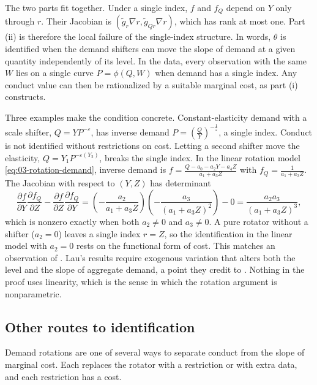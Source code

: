 The two parts fit together. Under a single index, $f$ and $f_Q$ depend on $Y$ only through $r$. Their Jacobian is
$\left(\tilde g_r \nabla r, \tilde g_{Qr}\nabla r\right)$, which has rank at most one. Part (ii) is therefore the local
failure of the single-index structure. In words, $\theta$ is identified when the demand shifters can move the slope of
demand at a given quantity independently of its level. In the data, every observation with the same $W$ lies on a single
curve $P = \phi(Q, W)$ when demand has a single index. Any conduct value can then be rationalized by a suitable marginal
cost, as part (i) constructs.

Three examples make the condition concrete. Constant-elasticity demand with a scale shifter, $Q = Y P^{-\varepsilon}$, has
inverse demand $P = (\frac{Q}{Y})^{-\frac{1}{\varepsilon}}$, a single index. Conduct is not identified without restrictions
on cost. Letting a second shifter move the elasticity, $Q = Y_1 P^{-\varepsilon(Y_2)}$, breaks the single index. In the
linear rotation model \eqref{eq:03-rotation-demand}, inverse demand is $f = \frac{Q - a_0 - a_2 Y - a_4 Z}{a_1 + a_3 Z}$ with
$f_Q = \frac{1}{a_1 + a_3 Z}$. The Jacobian with respect to $(Y, Z)$ has determinant
\begin{equation*}
\frac{\partial f}{\partial Y}\frac{\partial f_Q}{\partial Z} - \frac{\partial f}{\partial Z}\frac{\partial f_Q}{\partial Y}
= \left(-\frac{a_2}{a_1 + a_3 Z}\right)\left(-\frac{a_3}{(a_1 + a_3 Z)^2}\right) - 0
= \frac{a_2 a_3}{(a_1 + a_3 Z)^3} ,
\end{equation*}
which is nonzero exactly when both $a_2 \neq 0$ and $a_3 \neq 0$. A pure rotator without a shifter ($a_2 = 0$) leaves a
single index $r = Z$, so the identification in the linear model with $a_2 = 0$ rests on the functional form of cost. This
matches an observation of \citet[p.~1754]{BerryHaile2014}. Lau's results require exogenous variation that alters both
the level and the slope of aggregate demand, a point they credit to \citet{Nevo1998}. Nothing in the proof uses
linearity, which is the sense in which the rotation argument is nonparametric.

\subsection{Other routes to identification}\label{sec:03-other-routes}

Demand rotations are one of several ways to separate conduct from the slope of marginal cost. Each replaces the rotator
with a restriction or with extra data, and each restriction has a cost.

